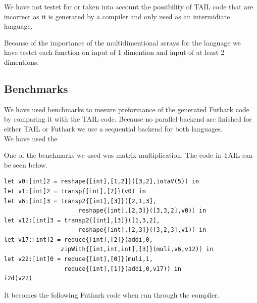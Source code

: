 \documentclass[11pt]{article}
\begin{document}
We have not testet for or taken into account the possibility of TAIL code that are incorrect as it is generated by a compiler and only used as an intermidiate language. 

Because of the importance of the multidimentional arrays for the language we have testet each function on input of 1 dimention and input of at least 2 dimentions. 

\subsection{Benchmarks}
We have used benchmarks to mesure preformance of the generated Futhark code by comparing it with the TAIL code.
Because no parallel backend are finished for either TAIL or Futhark we use a sequential backend for both languages. \\

We have used the 


One of the benchmarks we used was matrix multiplication. The code in TAIL can be seen below. 

\begin{lstlisting}
let v0:[int]2 = reshape{[int],[1,2]}([3,2],iotaV(5)) in
let v1:[int]2 = transp{[int],[2]}(v0) in
let v6:[int]3 = transp2{[int],[3]}([2,1,3],
                     reshape{[int],[2,3]}([3,3,2],v0)) in
let v12:[int]3 = transp2{[int],[3]}([1,3,2],
                     reshape{[int],[2,3]}([3,2,3],v1)) in
let v17:[int]2 = reduce{[int],[2]}(addi,0,
                zipWith{[int,int,int],[3]}(muli,v6,v12)) in
let v22:[int]0 = reduce{[int],[0]}(muli,1,
                 reduce{[int],[1]}(addi,0,v17)) in
i2d(v22)
\end{lstlisting}

It becomes the following Futhark code when run through the compiler.

{} 

\end{document}
